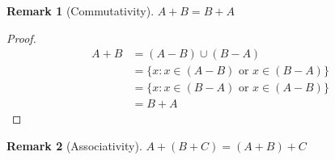 \documentclass[12pt]{article}
\newtheorem{remark}{Remark}
\begin{document}
\begin{remark}[Commutativity]
    $A + B = B + A$
\end{remark}
\begin{proof}
    \begin{align*}
        A + B &= (A - B) \cup (B - A)\\
              &= \{x: x \in (A - B) \text{ or } x \in (B - A)\}\\
              &= \{x: x \in (B - A) \text{ or } x \in (A - B)\}\\
              &= B + A
    \end{align*}
\end{proof}

\begin{remark}[Associativity]
    $A + (B + C) = (A + B) + C$
\end{remark}
\end{document}

